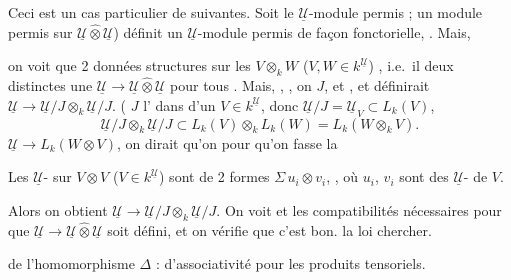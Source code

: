 \documentclass[11pt,a4paper]{article}
\begin{document}
\struck{\ill{}}

Ceci est un cas particulier de   suivantes. Soit
le $\underline{\mathcal{U}}$-module permis ; \ill{} un module permis sur
$\underline{\mathcal{U}} \mathbin{\hat{\otimes}} \underline{\mathcal{U}}$)
définit un $\underline{\mathcal{U}}$-module permis de façon fonctorielle, \ill{}
. Mais,
\ill{}


\ill{} on voit que 2 données 
\struck{\ill{}} structures sur les $V \otimes_{k} W$
($V, W \in k^{\underline{\mathcal{U}}}$) \ill{}, i.e.\ il \ill{} deux \ill{}
distinctes \ill{} une $\underline{\mathcal{U}} \to \underline{\mathcal{U}}
\mathbin{\hat{\otimes}} \underline{\mathcal{U}}$ \ill{} pour tous \ill{}. Mais,
\struck{\ill{}}, \ill{}, on \ill{} $J$, \ill{} et \ill{}, et \ill{} définirait
$\underline{\mathcal{U}} \to \underline{\mathcal{U}}/J \otimes_{k}
\underline{\mathcal{U}}/J$. ( \ill{} $J$ \ill{} l'\ill{} dans \ill{} d'un
$V \in k^{\underline{\mathcal{U}}}$, donc $\underline{\mathcal{U}}/J =
\underline{\mathcal{U}}_{V} \subset L_{k}(V)$,
\[ \underline{\mathcal{U}}/J \otimes_{k} \underline{\mathcal{U}}/J
   \subset L_{k}(V) \otimes_{k} L_{k}(W) = L_{k}(W \otimes_{k} V) . \]
\struck{\ill{}} \ill{} $\underline{\mathcal{U}} \to L_{k}(W \otimes V)$, on
dirait qu'on \ill{} pour qu'on fasse la  \ill{}

Les $\underline{\mathcal{U}}$- sur $V \otimes V$
($V \in k^{\underline{\mathcal{U}}}$) sont de 2 formes
$\Sigma\, u_i \otimes v_i$, \ill{}, où $u_i$, $v_i$ sont des
$\underline{\mathcal{U}}$- de $V$.

Alors on obtient $\underline{\mathcal{U}} \to \underline{\mathcal{U}}/J
\otimes_{k} \underline{\mathcal{U}}/J$. On voit \ill{} et les compatibilités
nécessaires pour que $\underline{\mathcal{U}} \to \underline{\mathcal{U}}
\mathbin{\hat{\otimes}} \underline{\mathcal{U}}$ soit défini, et on vérifie que
c'est bon. \ill{} la loi \ill{} chercher.



  de
l'homomorphisme $\Delta$ :  d'associativité
pour les produits tensoriels.
\end{document}
